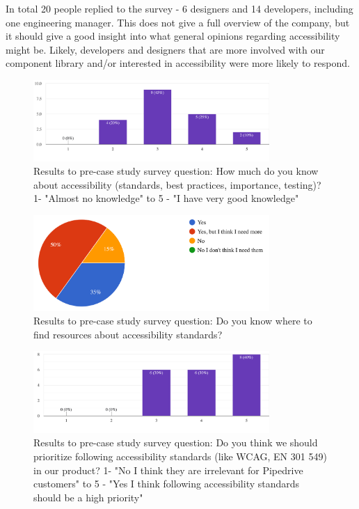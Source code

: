 \documentclass{master_thesis}
\begin{document}
In total 20 people replied to the survey - 6 designers and 14 developers, including one engineering manager. This does not give a full overview of the company, but it should give a good insight into what general opinions regarding accessibility might be. Likely, developers and designers that are more involved with our component library and/or interested in accessibility were more likely to respond.

\begin{figure}[H]
    \centering
    \includegraphics[width=0.8\textwidth]{img/a11y-knowledge.png}
    \caption{Results to pre-case study survey question: How much do you know about accessibility (standards, best practices, importance, testing)? 1- "Almost no knowledge" to 5 - "I have very good knowledge" }
    \label{fig:a11y-knowledge}
\end{figure}

\begin{figure}[H]
    \centering
    \includegraphics[width=0.8\textwidth]{img/a11y-resources.png}
    \caption{Results to pre-case study survey question: Do you know where to find resources about accessibility standards? }
    \label{fig:a11y-resources}
\end{figure}

\begin{figure}[H]
    \centering
    \includegraphics[width=0.8\textwidth]{img/a11y-priority.png}
    \caption{Results to pre-case study survey question: Do you think we should prioritize following accessibility standards (like WCAG, EN 301 549) in our product? 1- "No I think they are irrelevant for Pipedrive customers" to 5 - "Yes I think following accessibility standards should be a high priority" }
    \label{fig:a11y-priority}
\end{figure}
\end{document}
